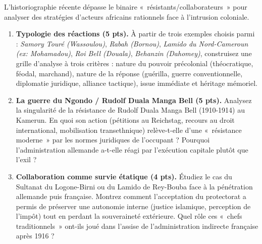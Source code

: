 \documentclass[11pt]{article}
\begin{document}
\begin{exercice}
\noindent L'historiographie récente dépasse le binaire «~résistants/collaborateurs~» pour analyser des stratégies d'acteurs africains rationnels face à l'intrusion coloniale.

\begin{enumerate}
    \item \textbf{Typologie des réactions (5 pts).} À partir de trois exemples choisis parmi : \textit{Samory Touré (Wassoulou)}, \textit{Rabah (Bornou)}, \textit{Lamido du Nord-Cameroun (ex: Mohamadou)}, \textit{Roi Bell (Douala)}, \textit{Behanzin (Dahomey)}, construisez une grille d'analyse à trois critères : nature du pouvoir précolonial (théocratique, féodal, marchand), nature de la réponse (guérilla, guerre conventionnelle, diplomatie juridique, alliance tactique), issue immédiate et héritage mémoriel.
    \item \textbf{La guerre du Ngondo / Rudolf Duala Manga Bell (5 pts).} Analysez la singularité de la résistance de Rudolf Duala Manga Bell (1910-1914) au Kamerun. En quoi son action (pétitions au Reichstag, recours au droit international, mobilisation transethnique) relève-t-elle d'une «~résistance moderne~» par les normes juridiques de l'occupant ? Pourquoi l'administration allemande a-t-elle réagi par l'exécution capitale plutôt que l'exil ?
    \item \textbf{Collaboration comme survie étatique (4 pts).} Étudiez le cas du Sultanat du Logone-Birni ou du Lamido de Rey-Bouba face à la pénétration allemande puis française. Montrez comment l'acceptation du protectorat a permis de préserver une autonomie interne (justice islamique, perception de l'impôt) tout en perdant la souveraineté extérieure. Quel rôle ces «~chefs traditionnels~» ont-ils joué dans l'assise de l'administration indirecte française après 1916 ?
\end{enumerate}
\end{exercice}
\end{document}
